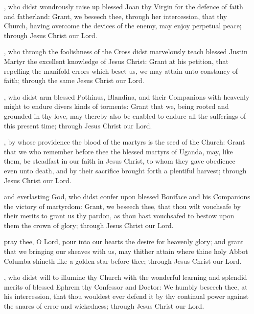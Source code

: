 , who didst wondrously raise up blessed Joan thy Virgin for the defence of faith and fatherland: Grant, we beseech thee, through her intercession, that thy Church, having overcome the devices of the enemy, may enjoy perpetual peace; through Jesus Christ our Lord.

, who through the foolishness of the Cross didst marvelously teach blessed Justin Martyr the excellent knowledge of Jesus Christ: Grant at his petition, that repelling the manifold errors which beset us, we may attain unto constancy of faith; through the same Jesus Christ our Lord.

, who didst arm blessed Pothinus, Blandina, and their Companions with heavenly might to endure divers kinds of torments: Grant that we, being rooted and grounded in thy love, may thereby also be enabled to endure all the sufferings of this present time; through Jesus Christ our Lord.

, by whose providence the blood of the martyrs is the seed of the Church: Grant that we who remember before thee the blessed martyrs of Uganda, may, like them, be steadfast in our faith in Jesus Christ, to whom they gave obedience even unto death, and by their sacrifice brought forth a plentiful harvest; through Jesus Christ our Lord.

 and everlasting God, who didst confer upon blessed Boniface and his Companions the victory of martyrdom: Grant, we beseech thee, that thou wilt vouchsafe by their merits to grant us thy pardon, as thou hast vouchsafed to bestow upon them the crown of glory; through Jesus Christ our Lord.

 pray thee, O Lord, pour into our hearts the desire for heavenly glory; and grant that we bringing our sheaves with us, may thither attain where thine holy Abbot Columba shineth like a golden star before thee; through Jesus Christ our Lord.

, who didst will to illumine thy Church with the wonderful learning and splendid merits of blessed Ephrem thy Confessor and Doctor: We humbly beseech thee, at his intercession, that thou wouldest ever defend it by thy continual power against the snares of error and wickedness; through Jesus Christ our Lord.

